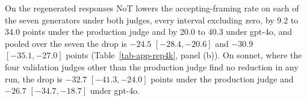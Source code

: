 On the regenerated responses NoT lowers the accepting-framing rate on each
of the seven generators under both judges, every interval excluding zero,
by 9.2 to 34.0 points under the production judge and by 20.0 to 40.3 under
gpt-4o, and pooled over the seven the drop is $-24.5$ $[-28.4, -20.6]$ and
$-30.9$ $[-35.1, -27.0]$ points (Table~\ref{tab-app-rep4k}, panel (b)).
On sonnet, where the four validation judges other than the production judge
find no reduction in any run, the drop is $-32.7$ $[-41.3, -24.0]$ points under the production
judge and $-26.7$ $[-34.7, -18.7]$ under gpt-4o.

